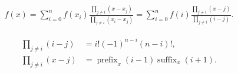 \[
\begin{aligned}
f(x)
= \sum_{i=0}^{n} f(x_i)
   \frac{\displaystyle\prod_{j\ne i}(x-x_j)}
        {\displaystyle\prod_{j\ne i}(x_i-x_j)}
= \sum_{i=0}^{n} f(i)
   \frac{\displaystyle\prod_{j\ne i}(x-j)}
        {\displaystyle\prod_{j\ne i}(i-j)}.
\end{aligned}
\]

\[
\begin{aligned}
\prod_{j\ne i}(i-j)
&= i!(-1)^{n-i}(n-i)!, \\[4pt]
\prod_{j\ne i}(x-j)
&= \operatorname{prefix}_x(i-1)
   \operatorname{suffix}_x(i+1).
\end{aligned}
\]
